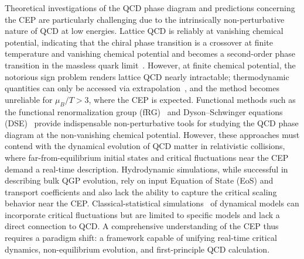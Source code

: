 \documentclass[letterpaper,11pt]{article}
\begin{document}
Theoretical investigations of the QCD phase diagram and predictions concerning the CEP are particularly challenging due to the intrinsically non-perturbative nature of QCD at low energies. Lattice QCD is reliably at vanishing chemical potential, indicating that the chiral phase transition is a crossover at finite temperature and vanishing chemical potential and becomes a second-order phase transition in the massless quark limit~\cite{HotQCD:2019xnw}. However, at finite chemical potential, the notorious sign problem renders lattice QCD nearly intractable; thermodynamic quantities can only be accessed via extrapolation~\cite{Bollweg:2022rps}, and the method becomes unreliable for $\mu_B/T>3$, where the CEP is expected. Functional methods such as the functional renormalization group (fRG)~\cite{Dupuis:2020fhh} and Dyson–Schwinger equations (DSE)~\cite{Fischer:2018sdj} provide indispensable non-perturbative tools for studying the QCD phase diagram at the non-vanishing chemical potential. However, these approaches must contend with the dynamical evolution of QCD matter in relativistic collisions, where far-from-equilibrium initial states and critical fluctuations near the CEP demand a real-time description. Hydrodynamic simulations, while successful in describing bulk QGP evolution, rely on input Equation of State (EoS) and transport coefficients and also lack the ability to capture the critical scaling behavior near the CEP. Classical-statistical simulations~\cite{Schlichting:2019tbr,Schweitzer:2020noq,Schweitzer:2021iqk} of dynamical models can incorporate critical fluctuations but are limited to specific models and lack a direct connection to QCD. A comprehensive understanding of the CEP thus requires a paradigm shift: a framework capable of unifying real-time critical dynamics, non-equilibrium evolution, and first-principle QCD calculation.
\end{document}
